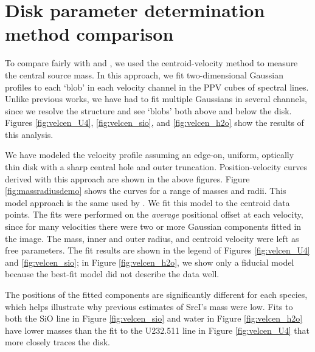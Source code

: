 \documentclass[twocolumn]{aastex61}
\newcommand{\sourcei}{SrcI\xspace}
\begin{document}
\section{Disk parameter determination method comparison}
\label{appendix:centroids}
To compare fairly with \citet{Hirota2014a} and \citet{Plambeck2016a}, we  used
the centroid-velocity method to measure the central source mass.  In this
approach, we fit two-dimensional Gaussian profiles to each `blob' in each
velocity channel in the PPV cubes of spectral lines.  Unlike previous works, we
have had to fit multiple Gaussians in several channels, since we resolve the
structure and see `blobs' both above and below the disk.  Figures
\ref{fig:velcen_U4}, \ref{fig:velcen_sio}, and \ref{fig:velcen_h2o} show the
results of this analysis.



We have modeled the velocity profile assuming an edge-on, uniform, optically
thin disk with a sharp central hole and outer truncation.  Position-velocity
curves derived with this approach are shown in the above figures. Figure
\ref{fig:massradiusdemo} shows the curves for a range of masses and radii.
This model approach is the same used by \citet{Plambeck2016a}.  We fit this
model to the centroid data points.  The fits were performed on the
\emph{average} positional offset at each velocity, since for many velocities
there were two or more Gaussian components fitted in the image.  The mass,
inner and outer radius, and centroid velocity were left as free parameters.
The fit results are shown in the legend of Figures 
\ref{fig:velcen_U4} and \ref{fig:velcen_sio}; in Figure \ref{fig:velcen_h2o},
we show only a fiducial model because the best-fit model did not describe
the data well.

The positions of the fitted components are significantly different for each
species, which helps illustrate why previous estimates of \sourcei's mass were
low.  Fits to both the SiO line in Figure \ref{fig:velcen_sio} and water in
Figure \ref{fig:velcen_h2o} have lower masses than the fit to the U232.511 line
in Figure \ref{fig:velcen_U4} that more closely traces the disk.
\end{document}

